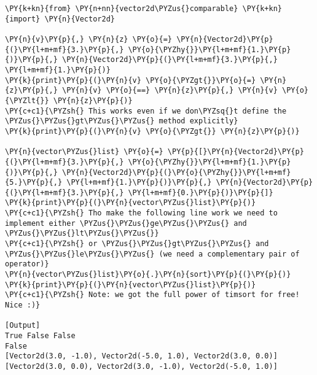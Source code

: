 \begin{Verbatim}[label=\makebox{\url{https://github.com/lucabaldini/cmepda/tree/master/slides/latex/snippets/test\_vector2d\_comparable.py}},commandchars=\\\{\}]
\PY{k+kn}{from} \PY{n+nn}{vector2d\PYZus{}comparable} \PY{k+kn}{import} \PY{n}{Vector2d}

\PY{n}{v}\PY{p}{,} \PY{n}{z} \PY{o}{=} \PY{n}{Vector2d}\PY{p}{(}\PY{l+m+mf}{3.}\PY{p}{,} \PY{o}{\PYZhy{}}\PY{l+m+mf}{1.}\PY{p}{)}\PY{p}{,} \PY{n}{Vector2d}\PY{p}{(}\PY{l+m+mf}{3.}\PY{p}{,} \PY{l+m+mf}{1.}\PY{p}{)}
\PY{k}{print}\PY{p}{(}\PY{n}{v} \PY{o}{\PYZgt{}}\PY{o}{=} \PY{n}{z}\PY{p}{,} \PY{n}{v} \PY{o}{==} \PY{n}{z}\PY{p}{,} \PY{n}{v} \PY{o}{\PYZlt{}} \PY{n}{z}\PY{p}{)}
\PY{c+c1}{\PYZsh{} This works even if we don\PYZsq{}t define the \PYZus{}\PYZus{}gt\PYZus{}\PYZus{} method explicitly}
\PY{k}{print}\PY{p}{(}\PY{n}{v} \PY{o}{\PYZgt{}} \PY{n}{z}\PY{p}{)}

\PY{n}{vector\PYZus{}list} \PY{o}{=} \PY{p}{[}\PY{n}{Vector2d}\PY{p}{(}\PY{l+m+mf}{3.}\PY{p}{,} \PY{o}{\PYZhy{}}\PY{l+m+mf}{1.}\PY{p}{)}\PY{p}{,} \PY{n}{Vector2d}\PY{p}{(}\PY{o}{\PYZhy{}}\PY{l+m+mf}{5.}\PY{p}{,} \PY{l+m+mf}{1.}\PY{p}{)}\PY{p}{,} \PY{n}{Vector2d}\PY{p}{(}\PY{l+m+mf}{3.}\PY{p}{,} \PY{l+m+mf}{0.}\PY{p}{)}\PY{p}{]}
\PY{k}{print}\PY{p}{(}\PY{n}{vector\PYZus{}list}\PY{p}{)}
\PY{c+c1}{\PYZsh{} Tho make the following line work we need to implement either \PYZus{}\PYZus{}ge\PYZus{}\PYZus{} and \PYZus{}\PYZus{}lt\PYZus{}\PYZus{}}
\PY{c+c1}{\PYZsh{} or \PYZus{}\PYZus{}gt\PYZus{}\PYZus{} and \PYZus{}\PYZus{}le\PYZus{}\PYZus{} (we need a complementary pair of operator)}
\PY{n}{vector\PYZus{}list}\PY{o}{.}\PY{n}{sort}\PY{p}{(}\PY{p}{)}
\PY{k}{print}\PY{p}{(}\PY{n}{vector\PYZus{}list}\PY{p}{)}
\PY{c+c1}{\PYZsh{} Note: we got the full power of timsort for free! Nice :)}

[Output]
True False False
False
[Vector2d(3.0, -1.0), Vector2d(-5.0, 1.0), Vector2d(3.0, 0.0)]
[Vector2d(3.0, 0.0), Vector2d(3.0, -1.0), Vector2d(-5.0, 1.0)]
\end{Verbatim}